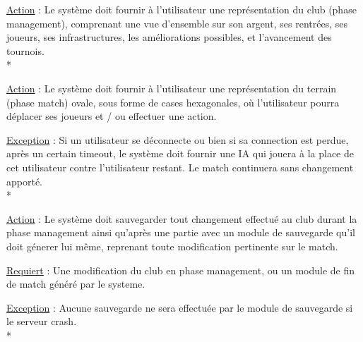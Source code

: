\documentclass[a4paper]{article}
\begin{document}
\begin{description}[style=nextline]
			\item[Représenter phase management :]
			\begin{description}[leftmargin=*] %
				\item[]
				\item \underline{Action} : Le système doit fournir à l'utilisateur une représentation du \gls{club} (phase management), comprenant une vue d'ensemble sur son argent, ses rentrées, ses joueurs, ses infrastructures, les améliorations possibles, et l'avancement des tournois.\\*
			\end{description} %
			
			\item[Représenter phase match :]
			\begin{description}[leftmargin=*] %
				\item[]
				\item \underline{Action} : Le système doit fournir à l'utilisateur une représentation du terrain (phase match) ovale, sous forme de cases hexagonales, où l'utilisateur pourra déplacer ses joueurs et / ou effectuer une action.
				\item \underline{Exception} : Si un utilisateur se déconnecte ou bien si sa connection est perdue, après un certain timeout, le système doit fournir une IA qui jouera à la place de cet utilisateur contre l'utilisateur restant. Le match continuera sans changement apporté.\\*
			\end{description} %
			
			\item[Sauvegarder :]
			\begin{description}[leftmargin=*] %
				\item[]
				\item \underline{Action} : Le système doit sauvegarder tout changement effectué au \gls{club} durant la phase management ainsi qu'après une partie avec un module de sauvegarde qu'il doit génerer lui même, reprenant toute modification pertinente sur le match.
				\item \underline{Requiert} : Une modification du club en phase management, ou un module de fin de match généré par le systeme. 
				\item \underline{Exception} : Aucune sauvegarde ne sera effectuée par le module de sauvegarde si le serveur crash.\\*
			\end{description} %
			

\end{description}
\end{document}

